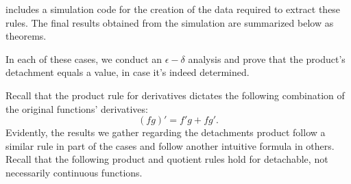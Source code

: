 \documentclass[11pt]{book}
\begin{document}
\cite{shachar_2020} includes a simulation code for the creation of the data required to extract these rules. The final results obtained from the simulation are summarized below as theorems.

In each of these cases, we conduct an $\epsilon-\delta$ analysis and prove that the product's detachment equals a value, in case it's indeed determined.

Recall that the product rule for derivatives dictates the following combination of the original functions' derivatives: $$\left(fg\right)'=f'g+fg'.$$ Evidently, the results we gather regarding the detachments product follow a similar rule in part of the cases and follow another intuitive formula in others. Recall that the following product and quotient rules hold for detachable, not necessarily continuous functions.
\end{document}
